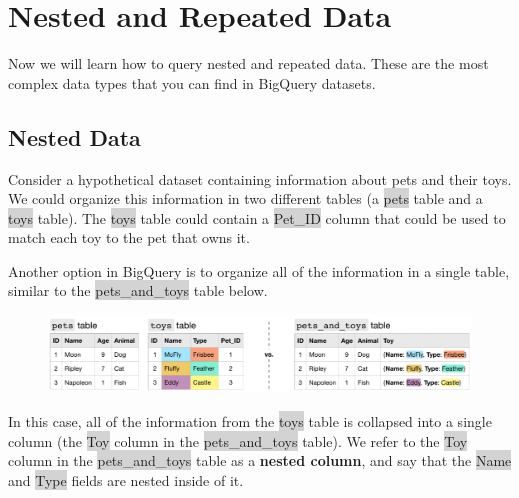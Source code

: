 \documentclass[11pt]{article}
\begin{document}
{{{{{{{{\newpage
\section{Nested and Repeated Data}
Now we will learn how to query nested and repeated data. These are the most complex data types that you can find in BigQuery datasets. 

\subsection{Nested Data}
Consider a hypothetical dataset containing information about pets and their toys. We could organize this information in two different tables (a \colorbox{lightgray}{pets} table and a \colorbox{lightgray}{toys} table). The \colorbox{lightgray}{toys} table could contain a \colorbox{lightgray}{Pet\_ID} column that could be used to match each toy to the pet that owns it.

Another option in BigQuery is to organize all of the information in a single table, similar to the \colorbox{lightgray}{pets\_and\_toys} table below.
\begin{figure}[H]
\includegraphics[scale = 0.6]{6_1}
\centering
\end{figure}
\vspace{-4mm}
In this case, all of the information from the \colorbox{lightgray}{toys} table is collapsed into a single column (the \colorbox{lightgray}{Toy} column in the \colorbox{lightgray}{pets\_and\_toys} table). We refer to the \colorbox{lightgray}{Toy} column in the \colorbox{lightgray}{pets\_and\_toys} table as a \textbf{nested column}, and say that the \colorbox{lightgray}{Name} and \colorbox{lightgray}{Type} fields are nested inside of it.

}}}}}}}}
\end{document}
